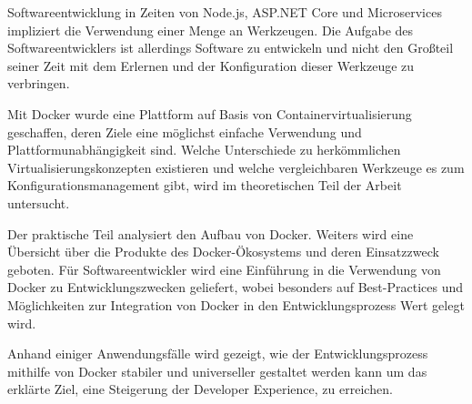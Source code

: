 Softwareentwicklung in Zeiten von Node.js, ASP.NET Core und Microservices impliziert die Verwendung einer Menge an Werkzeugen.
Die Aufgabe des Softwareentwicklers ist allerdings Software zu entwickeln und nicht den Großteil seiner Zeit mit dem Erlernen und der Konfiguration dieser Werkzeuge zu verbringen.

Mit Docker wurde eine Plattform auf Basis von Containervirtualisierung geschaffen, deren Ziele eine möglichst einfache Verwendung und Plattformunabhängigkeit sind.
Welche Unterschiede zu herkömmlichen Virtualisierungskonzepten existieren und welche vergleichbaren Werkzeuge es zum Konfigurationsmanagement gibt, wird im theoretischen Teil der Arbeit untersucht.

Der praktische Teil analysiert den Aufbau von Docker.
Weiters wird eine Übersicht über die Produkte des Docker-Ökosystems und deren Einsatzzweck geboten.
Für Softwareentwickler wird eine Einführung in die Verwendung von Docker zu Entwicklungszwecken geliefert, wobei besonders auf Best-Practices und Möglichkeiten zur Integration von Docker in den Entwicklungsprozess Wert gelegt wird. 

Anhand einiger Anwendungsfälle wird gezeigt, wie der Entwicklungsprozess mithilfe von Docker stabiler und universeller gestaltet werden kann um das erklärte Ziel, eine Steigerung der Developer Experience, zu erreichen.
